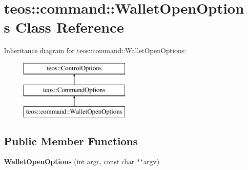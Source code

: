 \hypertarget{classteos_1_1command_1_1_wallet_open_options}{}\section{teos\+:\+:command\+:\+:Wallet\+Open\+Options Class Reference}
\label{classteos_1_1command_1_1_wallet_open_options}
Inheritance diagram for teos\+:\+:command\+:\+:Wallet\+Open\+Options\+:\begin{figure}[H]
\begin{center}
\leavevmode
\includegraphics[height=3.000000cm]{classteos_1_1command_1_1_wallet_open_options}
\end{center}
\end{figure}
\subsection*{Public Member Functions}
\begin{DoxyCompactItemize}
\item 
\mbox{\label{classteos_1_1command_1_1_wallet_open_options_acca0aca60a4dfb23f0a87cbb551ed473}} 
{\bfseries Wallet\+Open\+Options} (int argc, const char $\ast$$\ast$argv)
\end{DoxyCompactItemize}
